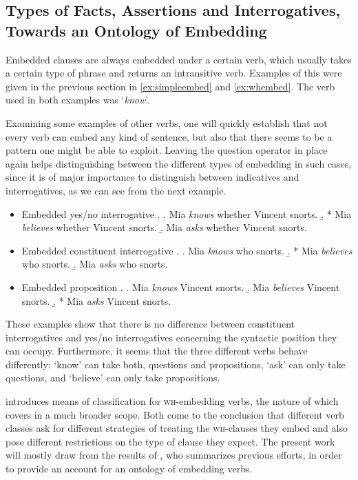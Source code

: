 \documentclass[notitlepage,twoside,a4paper]{scrreprt}
\newcommand{\example}[1]{`\textit{#1}'} %
\newcommand{\wh}{\textsc{wh}}
\theoremstyle{remark}
\theoremstyle{remark}
\theoremstyle{definition}
\theoremstyle{definition}
\begin{document}
\subsection{Types of Facts, Assertions and Interrogatives, Towards an
Ontology of Embedding}\label{sec:ontology}

Embedded clauses are always embedded under a certain verb, which usually
takes a certain type of phrase and returns an intransitive verb. Examples of
this were given in the previous section in \ref{ex:simpleembed} and
\ref{ex:whembed}. The verb used in both examples was \example{know}.

Examining some examples of other verbs, one will quickly establish that not
every verb can embed any kind of sentence, but also that there seems to be  a
pattern one might be able to exploit. Leaving the question operator in place
again helps distinguishing between the different types of embedding in such
cases, since it is of major importance to distinguish between indicatives and
interrogatives, as we can see from the next example.

\begin{itemize}
  \item Embedded yes/no interrogative
  \ex. \a. Mia \emph{knows} whether Vincent snorts.
  \b. * Mia \emph{believes} whether Vincent snorts.
  \b. Mia \emph{asks} whether Vincent snorts.

  \item Embedded constituent interrogative
  \ex. \a.  Mia \emph{knows} who snorts.
  \b. * Mia \emph{believes} who snorts.
  \b. Mia \emph{asks} who snorts.

  \item Embedded proposition
  \ex. \a. Mia \emph{knows} Vincent snorts.
  \b. Mia \emph{believes} Vincent snorts.
  \b. * Mia \emph{asks} Vincent snorts.

\end{itemize}

These examples show that there is no difference between
constituent interrogatives and yes/no interrogatives concerning the syntactic
position they can occupy. Furthermore, it seems that the three different verbs
behave differently: `know' can take both, questions and propositions, `ask' can
only take questions, and `believe' can only take propositions.

\cite{karttunen:1977} introduces means of classification for \wh-embedding
verbs, the nature of which \cite{lahiri:diss} covers in a much broader scope.
Both come to the conclusion that different verb classes ask for different
strategies of treating the \wh-clauses they embed and also pose different
restrictions on the type of clause they expect. The present work will mostly
draw from the results of \cite{ginzburg}, who summarizes previous efforts,
in order to provide an account for an ontology of embedding verbs.
\end{document}

